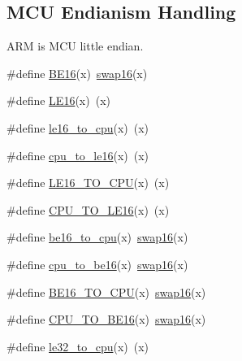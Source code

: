 \subsection*{M\+CU Endianism Handling}
\label{_amgrpc36c0117ea92446a6a59adb04c50c165}%
 A\+RM is M\+CU little endian. \begin{DoxyCompactItemize}
\item 
\#define \mbox{\hyperlink{group__group__sam0__utils_ga34c0ccbaef341c224a18eb4dcaf44407}{B\+E16}}(x)~\mbox{\hyperlink{group__group__sam0__utils_ga3067f71c33a89726a107430050253045}{swap16}}(x)
\item 
\#define \mbox{\hyperlink{group__group__sam0__utils_ga54d648861a1120a3f8d6255e9cf54125}{L\+E16}}(x)~(x)
\item 
\#define \mbox{\hyperlink{group__group__sam0__utils_ga65e9510f535c1ee2f826d447471289fa}{le16\+\_\+to\+\_\+cpu}}(x)~(x)
\item 
\#define \mbox{\hyperlink{group__group__sam0__utils_gaeda3065f344779edb9023e22d84d5f92}{cpu\+\_\+to\+\_\+le16}}(x)~(x)
\item 
\#define \mbox{\hyperlink{group__group__sam0__utils_gaa0da5576d76569d3a7452897a91ea0e6}{L\+E16\+\_\+\+T\+O\+\_\+\+C\+PU}}(x)~(x)
\item 
\#define \mbox{\hyperlink{group__group__sam0__utils_gaa3d310efe7cd6126823b8721852d7e56}{C\+P\+U\+\_\+\+T\+O\+\_\+\+L\+E16}}(x)~(x)
\item 
\#define \mbox{\hyperlink{group__group__sam0__utils_ga48f33ad7b3de0010e5c802ced48f8a7b}{be16\+\_\+to\+\_\+cpu}}(x)~\mbox{\hyperlink{group__group__sam0__utils_ga3067f71c33a89726a107430050253045}{swap16}}(x)
\item 
\#define \mbox{\hyperlink{group__group__sam0__utils_gaf42a6506135fe9e671c40973bacc849f}{cpu\+\_\+to\+\_\+be16}}(x)~\mbox{\hyperlink{group__group__sam0__utils_ga3067f71c33a89726a107430050253045}{swap16}}(x)
\item 
\#define \mbox{\hyperlink{group__group__sam0__utils_gac1d027e9e570b4714b2e7e7fbd4b1e9e}{B\+E16\+\_\+\+T\+O\+\_\+\+C\+PU}}(x)~\mbox{\hyperlink{group__group__sam0__utils_ga3067f71c33a89726a107430050253045}{swap16}}(x)
\item 
\#define \mbox{\hyperlink{group__group__sam0__utils_gaea91d96b724b4a83b28c7c91cd920db4}{C\+P\+U\+\_\+\+T\+O\+\_\+\+B\+E16}}(x)~\mbox{\hyperlink{group__group__sam0__utils_ga3067f71c33a89726a107430050253045}{swap16}}(x)
\item 
\#define \mbox{\hyperlink{group__group__sam0__utils_ga48f527b00bc1d5e46366d720280a1039}{le32\+\_\+to\+\_\+cpu}}(x)~(x)

\end{DoxyCompactItemize}
